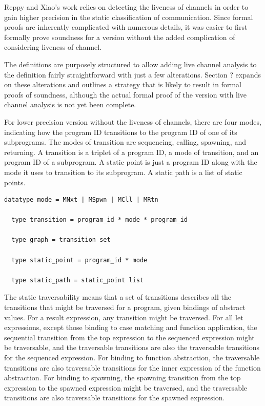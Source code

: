\documentclass{article}
\begin{document}
Reppy and Xiao's work relies on detecting the liveness of channels in order to gain higher
precision in the static classification of communication. Since formal proofs are inherently
complicated with numerous details, it was easier to first formally prove soundness for a
version without the added complication of considering liveness of channel.

The definitions are purposely structured to allow adding live channel analysis to the
definition fairly straightforward with just a few alterations.  Section ? expands on
these alterations and outlines a strategy that is likely to result in formal proofs of
soundness, although the actual formal proof of the version with live channel analysis is
not yet been complete.  

For lower precision version without the liveness of channels, there are four modes,
indicating how the program ID transitions to the program ID of one of
its subprograms.
The modes of transition are sequencing, calling, spawning, and returning. A transition is a
triplet of a program ID, a mode of transition, and an program ID of a
subprogram. A static point is just a program ID along with the mode it uses to
transition to its subprogram. A static path is a list of static points.  

\begin{lstlisting}[language=logic, mathescape]
  datatype mode = MNxt | MSpwn | MCll | MRtn

  type transition = program_id * mode * program_id

  type graph = transition set

  type static_point = program_id * mode

  type static_path = static_point list
  \end{lstlisting}

The static traversability means that a set of transitions describes all the transitions
that might be traversed for a program, given bindings of abstract values.  For a result
expression, any transition might be traversed.  For all let expressions, except those binding
to case matching and function application, the sequential transition from the top expression to
the sequenced expression might be traversable, and the traversable transitions are also the
traversable transitions for the sequenced expression.  For binding to function abstraction, the
traversable transitions are also traversable transitions for the inner expression of the
function abstraction.  For binding to spawning, the spawning transition from the top expression
to the spawned expression might be traversed, and the traversable transitions are also
traversable transitions for the spawned expression.
\end{document}
